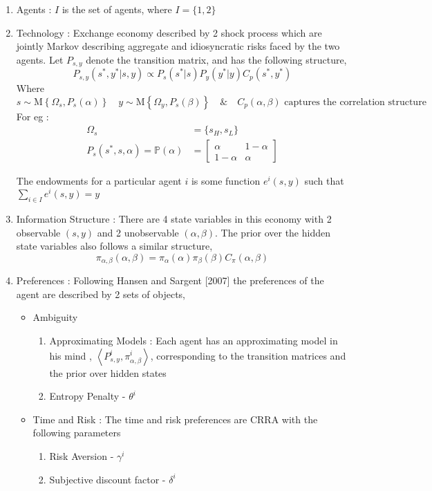 \documentclass[a4paper,12pt]{article}
\begin{document}
\begin{enumerate}
	\item Agents  : $I$ is the  set of agents, where $I= \{1,2\}$
	\item Technology : Exchange economy described by 2 shock process which are jointly Markov describing aggregate and idiosyncratic risks faced by the two agents. Let $P_{s,y}$ denote the transition matrix, and has the following structure,
	\[P_{s,y}(s^{*},y^* | s,y) \propto P_s(s^* |s)P_y(y^*|y)C_p(s^*,y^*)\]
Where 
\[s \sim \text{M}\left\{\Omega_s,P_s(\alpha)\right\}\quad y \sim \text{M}\left \{\Omega_y,P_s(\beta)\right\} \quad \& \quad C_p (\alpha,\beta)\text{ captures the correlation structure}\]
For eg : 
\begin{align*}
                 \Omega_s &= \lbrace s_H, s_L \rbrace \\
P_s(s^*,s,\alpha) = \mathbb{P}(\alpha) &= \begin{bmatrix}
	\alpha	        &1-\alpha \\
	1-\alpha        &\alpha
\end{bmatrix} 
\end{align*}

\noindent The endowments for a particular agent $i$ is some function $e^i(s,y)$ such that $\sum_{i \in I} e^{i}(s,y)=y$
\item Information Structure :  There are 4 state variables in this economy with 2 observable $(s,y)$ and 2 unobservable $(\alpha,\beta)$. The prior over the hidden state variables also follows a similar structure,
\[\pi_{\alpha,\beta}(\alpha,\beta) = \pi_{\alpha} (\alpha)\pi_{\beta} (\beta)C_\pi(\alpha,\beta)\]
	\item Preferences : Following Hansen and Sargent [2007] the preferences of the agent are described by 2 sets of objects, 
\begin{itemize}
	\item Ambiguity 
	
\begin{enumerate}
	\item Approximating Models : Each agent has an approximating model in his mind , $\left\langle  P_{s,y}^i, \pi_{\alpha,\beta}^i \right\rangle$, corresponding to the transition matrices and the prior over hidden states 
	\item Entropy Penalty - $\theta^i$
\end{enumerate}
\item Time and Risk : The time and risk preferences are CRRA with the following parameters 
\begin{enumerate}
	\item Risk Aversion - $\gamma^i$
	\item Subjective discount factor - $\delta^i$
\end{enumerate}
 

\end{itemize}
\end{enumerate}
\end{document}
